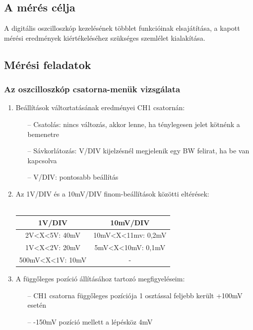 \documentclass[10pt,a4paper]{article}
\begin{document}
	\subsection{A mérés célja}
	A digitális oszcilloszkóp kezelésének többlet funkcióinak
elsajátítása, a kapott mérési eredmények kiértékeléséhez
szükséges szemlélet kialakítása.
	\subsection{Mérési feladatok}
		\subsubsection{Az oszcilloszkóp csatorna-menük vizsgálata}
		\begin{enumerate}
			\item Beállítások változtatásának eredményei CH1 csatornán:
				\begin{itemize}
					\item[--] Csatolás: nincs változás, akkor lenne, ha ténylegesen jelet kötnénk a bemenetre
					\item[--] Sávkorlátozás: V/DIV kijelzésnél megjelenik egy BW felirat, ha be van kapcsolva
					\item[--] V/DIV: pontosabb beállítás
				\end{itemize}
			\item Az 1V/DIV és a 10mV/DIV finom-beállítások közötti eltérések:\\\\
			\begin{tabular}{|c|c|}
			\hline 
			1V/DIV & 10mV/DIV \\ 
			\hline 
			2V<X<5V: 40mV & 10mV<X<11mv: 0,2mV \\ 
			\hline 
			1V<X<2V: 20mV & 5mV<X<10mV: 0,1mV \\ 
			\hline 
			500mV<X<1V: 10mV & - \\ 
			\hline 
			\end{tabular}
			\item A függőleges pozíció állításához tartozó megfigyeléseim:
				\begin{itemize}
					\item[--] CH1 csatorna függőleges pozíciója 1 osztással feljebb került +100mV esetén
					\item[--] -150mV pozíció mellett a lépésköz 4mV
				\end{itemize}				 
		\end{enumerate}
\end{document}
